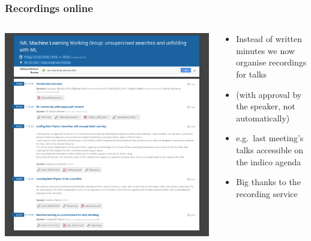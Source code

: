 \begin{frame}
  \frametitle{Recordings online}
  \begin{columns}
    \begin{column}{.6\textwidth}
      \includegraphics[width=.95\textwidth]{./rec.png}
    \end{column}
    \begin{column}{.4\textwidth}
      \begin{itemize}
        \item Instead of written minutes we now organise recordings for talks
        \item (with approval by the speaker, not automatically)
        \item e.g.\ last meeting's talks accessible on the indico agenda
        \item {\Large{Big thanks to the recording service}}
      \end{itemize}
    \end{column}
  \end{columns}
\end{frame}

